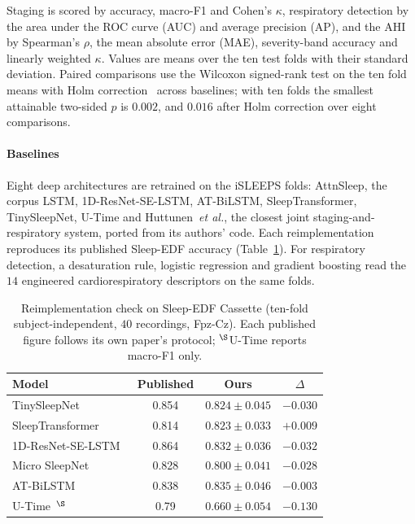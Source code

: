 \documentclass{ieeeaccess}
\begin{document}
Staging is scored by accuracy, macro-F1 and Cohen's $\kappa$, respiratory detection by the
area under the ROC curve (AUC) and average precision (AP), and the AHI by Spearman's $\rho$, the
mean absolute error (MAE), severity-band accuracy and linearly weighted $\kappa$. Values are
means over the ten test folds with their standard deviation. Paired comparisons use the
Wilcoxon signed-rank test on the ten fold means with Holm correction~\cite{holm1979simple}
across baselines; with ten folds the smallest attainable two-sided $p$ is $0.002$, and $0.016$
after Holm correction over eight comparisons.

\paragraph{Baselines} Eight deep architectures are retrained on the iSLEEPS folds: AttnSleep,
the corpus LSTM, 1D-ResNet-SE-LSTM, AT-BiLSTM, SleepTransformer, TinySleepNet, U-Time and
Huttunen~\textit{et al.}, the closest joint staging-and-respiratory system, ported from its
authors' code. Each reimplementation reproduces its published Sleep-EDF accuracy
(Table~\ref{tab:reimpl}). For respiratory detection, a desaturation rule, logistic regression and
gradient boosting read the $14$ engineered cardiorespiratory descriptors on the same folds.

\begin{table}[t]
\caption{Reimplementation check on Sleep-EDF Cassette (ten-fold subject-independent, $40$
recordings, Fpz-Cz). Each published figure follows its own paper's protocol; $^{\S}$U-Time
reports macro-F1 only.}
\label{tab:reimpl}
\centering
\small
\begin{tabular}{@{}l c c c@{}}
\toprule
Model & Published & Ours & $\Delta$ \\
\midrule
TinySleepNet~\cite{supratak2020tinysleepnet} & 0.854 & $0.824 \pm 0.045$ & $-0.030$ \\
SleepTransformer~\cite{sleeptransformer2022} & 0.814 & $0.823 \pm 0.033$ & $+0.009$ \\
1D-ResNet-SE-LSTM~\cite{li2023resnetselstm} & 0.864 & $0.832 \pm 0.036$ & $-0.032$ \\
Micro SleepNet~\cite{liu2023microsleepnet} & 0.828 & $0.800 \pm 0.041$ & $-0.028$ \\
AT-BiLSTM~\cite{fu2021atbilstm} & 0.838 & $0.835 \pm 0.046$ & $-0.003$ \\
U-Time~\cite{perslev2019utime}$^{\S}$ & 0.79 & $0.660 \pm 0.054$ & $-0.130$ \\
\bottomrule
\end{tabular}
\end{table}
\end{document}
